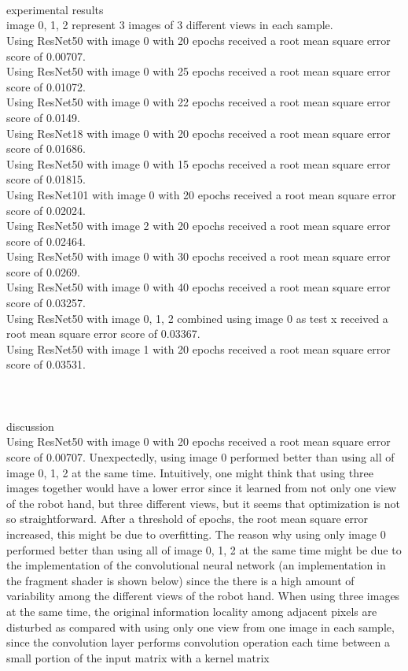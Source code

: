 \documentclass[12pt, border = 4pt, multi]{article} %
\begin{document}
\leavevmode
\noindent
\\
\\
\\
experimental results\\
image 0, 1, 2 represent 3 images of 3 different views in each sample.\\
Using ResNet50 with image 0 with 20 epochs received a root mean square error score of 0.00707.\\
Using ResNet50 with image 0 with 25 epochs received a root mean square error score of 0.01072.\\
Using ResNet50 with image 0 with 22 epochs received a root mean square error score of 0.0149.\\
Using ResNet18 with image 0 with 20 epochs received a root mean square error score of 0.01686.\\
Using ResNet50 with image 0 with 15 epochs received a root mean square error score of 0.01815.\\
Using ResNet101 with image 0 with 20 epochs received a root mean square error score of 0.02024.\\
Using ResNet50 with image 2 with 20 epochs received a root mean square error score of 0.02464.\\
Using ResNet50 with image 0 with 30 epochs received a root mean square error score of 0.0269.\\
Using ResNet50 with image 0 with 40 epochs received a root mean square error score of 0.03257.\\
Using ResNet50 with image 0, 1, 2 combined using image 0 as test x received a root mean square error score of 0.03367.\\
Using ResNet50 with image 1 with 20 epochs received a root mean square error score of 0.03531.\\
\\
\\
\\
discussion\\
Using ResNet50 with image 0 with 20 epochs received a root mean square error score of 0.00707. Unexpectedly, using image 0 performed better than using all of image 0, 1, 2 at the same time. Intuitively, one might think that using three images together would have a lower error since it learned from not only one view of the robot hand, but three different views, but it seems that optimization is not so straightforward. After a threshold of epochs, the root mean square error increased, this might be due to overfitting. The reason why using only image 0 performed better than using all of image 0, 1, 2 at the same time might be due to the implementation of the convolutional neural network (an implementation in the fragment shader is shown below) since the there is a high amount of variability among the different views of the robot hand. When using three images at the same time, the original information locality among adjacent pixels are disturbed as compared with using only one view from one image in each sample, since the convolution layer performs convolution operation each time between a small portion of the input matrix with a kernel matrix
\end{document}
